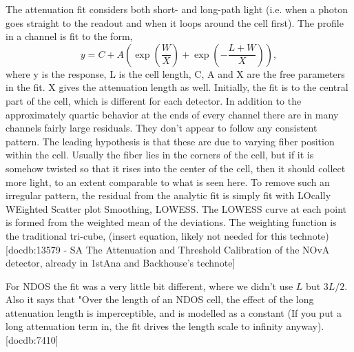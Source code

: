 \documentclass[12pt,a4paper]{article}
\begin{document}
The attenuation fit considers both short- and long-path light (i.e. when a photon goes straight to the readout and when it loops around the cell first). The profile in a channel is fit to the form,
\begin{equation}
y=C+A\left(\exp\left(\frac{W}{X}\right)+\exp\left(-\frac{L+W}{X}\right)\right),
\end{equation}
where y is the response, L is the cell length, C, A and X are the free parameters in the fit. X gives the attenuation length as well. Initially, the fit is to the central part of the cell, which is different for each detector. In addition to the approximately quartic behavior at the ends of every channel there are in many channels fairly large residuals. They don’t appear to follow any consistent pattern. The leading hypothesis is that these are due to varying fiber position within the cell. Usually the fiber lies in the corners of the cell, but if it is somehow twisted so that it rises into the center of the cell, then it should collect more light, to an extent comparable to what is seen here. To remove such an irregular pattern, the residual from the analytic fit is simply fit with LOcally WEighted Scatter plot Smoothing, LOWESS. The LOWESS curve at each point is formed from the weighted mean of the deviations. The weighting function is the traditional tri-cube, (insert equation, likely not needed for this technote) [docdb:13579 - SA The Attenuation and Threshold Calibration of the NOvA detector, already in 1stAna and Backhouse's technote]

For NDOS the fit was a very little bit different, where we didn't use $L$ but $3L/2$. Also it says that "Over the length of an NDOS cell, the effect of the long attenuation length is imperceptible, and is modelled as a constant (If you put a long attenuation term in, the fit drives the length scale to infinity anyway). [docdb:7410]
\end{document}

